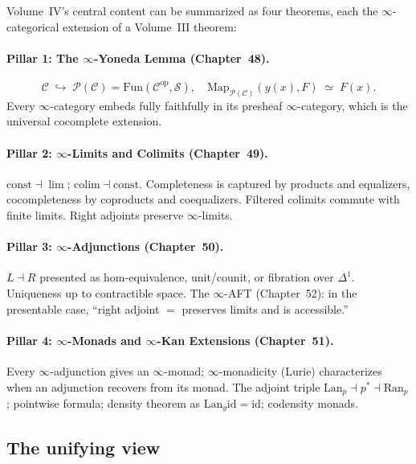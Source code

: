 Volume~IV's central content can be summarized as four theorems, each the
$\infty$-categorical extension of a Volume~III theorem:

\paragraph{Pillar 1: The $\infty$-Yoneda Lemma (Chapter~48).}
\begin{equation*}
  \mathcal{C} \;\hookrightarrow\; \mathcal{P}(\mathcal{C}) = \mathrm{Fun}(\mathcal{C}^{\mathrm{op}}, \mathcal{S}), \quad
  \mathrm{Map}_{\mathcal{P}(\mathcal{C})}(y(x), F) \;\simeq\; F(x).
\end{equation*}
Every $\infty$-category embeds fully faithfully in its presheaf
$\infty$-category, which is the universal cocomplete extension.

\paragraph{Pillar 2: $\infty$-Limits and Colimits (Chapter~49).}
$\mathrm{const} \dashv \lim$; $\mathrm{colim} \dashv \mathrm{const}$.
Completeness is captured by products and equalizers, cocompleteness by
coproducts and coequalizers. Filtered colimits commute with finite
limits. Right adjoints preserve $\infty$-limits.

\paragraph{Pillar 3: $\infty$-Adjunctions (Chapter~50).}
$L \dashv R$ presented as hom-equivalence, unit/counit, or fibration over
$\Delta^1$. Uniqueness up to contractible space. The $\infty$-AFT
(Chapter~52): in the presentable case, ``right adjoint $=$ preserves
limits and is accessible.''

\paragraph{Pillar 4: $\infty$-Monads and $\infty$-Kan Extensions (Chapter~51).}
Every $\infty$-adjunction gives an $\infty$-monad; $\infty$-monadicity
(Lurie) characterizes when an adjunction recovers from its monad. The
adjoint triple $\mathrm{Lan}_p \dashv p^* \dashv \mathrm{Ran}_p$;
pointwise formula; density theorem as $\mathrm{Lan}_y \mathrm{id} = \mathrm{id}$;
codensity monads.

\subsection{The unifying view}

